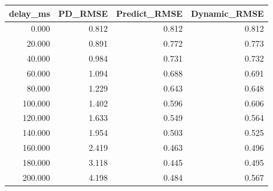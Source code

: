 \begin{tabular}{rrrr}
\toprule
delay_ms & PD_RMSE & Predict_RMSE & Dynamic_RMSE \\
\midrule
0.000 & 0.812 & 0.812 & 0.812 \\
20.000 & 0.891 & 0.772 & 0.773 \\
40.000 & 0.984 & 0.731 & 0.732 \\
60.000 & 1.094 & 0.688 & 0.691 \\
80.000 & 1.229 & 0.643 & 0.648 \\
100.000 & 1.402 & 0.596 & 0.606 \\
120.000 & 1.633 & 0.549 & 0.564 \\
140.000 & 1.954 & 0.503 & 0.525 \\
160.000 & 2.419 & 0.463 & 0.496 \\
180.000 & 3.118 & 0.445 & 0.495 \\
200.000 & 4.198 & 0.484 & 0.567 \\
\bottomrule
\end{tabular}
